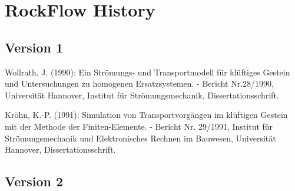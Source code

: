 \section{RockFlow History}

\subsection*{Version 1}

\begin{list}{}{\setlength{\itemindent}{-.5cm}}
\item Wollrath, J. (1990): Ein Str\"{o}mungs- und Transportmodell f\"{u}r kl\"{u}ftiges Gestein und Untersuchungen
                     zu homogenen Ersatzsystemen.
                     - Bericht Nr.28/1990, Universit\"{a}t Hannover, Institut f\"{u}r Str\"{o}\-mungs\-mechanik, Dissertationsschrift.

\item Kr\"{o}hn, K.-P. (1991): Simulation von Transportvorg\"{a}ngen im kl\"{u}ftigen Gestein mit der Methode der
                     Finiten-Elemente.
                     - Bericht Nr. 29/1991, Institut f\"{u}r Str\"{o}\-mungs\-mechanik und Elektronisches Rechnen im Bauwesen, Universit\"{a}t Hannover, Dissertationsschrift.
\end{list}


\subsection*{Version 2}


